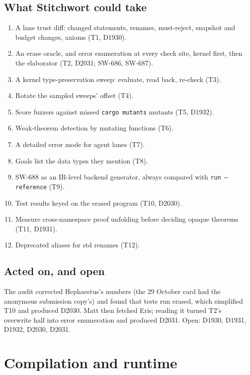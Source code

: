 \documentclass[11pt,a4paper]{article}
\newcommand{\code}[1]{\texttt{#1}}
\begin{document}
\subsection{What Stitchwort could take}
\begin{enumerate}
  \item A lane trust diff: changed statements, renames, must-reject, snapshot and budget
        changes, axioms (T1, D1930).
  \item An erase oracle, and error enumeration at every check site, kernel first, then the
        elaborator (T2, D2031; SW-686, SW-687).
  \item A kernel type-preservation sweep: evaluate, read back, re-check (T3).
  \item Rotate the sampled sweeps' offset (T4).
  \item Score fuzzers against missed \code{cargo mutants} mutants (T5, D1932).
  \item Weak-theorem detection by mutating functions (T6).
  \item A detailed error mode for agent lanes (T7).
  \item Goals list the data types they mention (T8).
  \item SW-688 as an IR-level backend generator, always compared with \code{run --reference}
        (T9).
  \item Test results keyed on the erased program (T10, D2030).
  \item Measure cross-namespace proof unfolding before deciding opaque theorems (T11, D1931).
  \item Deprecated aliases for std renames (T12).
\end{enumerate}

\subsection{Acted on, and open}
The audit corrected Hephaestus's numbers (the 29 October card had the anonymous submission
copy's) and found that tests run erased, which simplified T10 and produced D2030. Matt then
fetched Eris; reading it turned T2's overwrite half into error enumeration and produced D2031.
Open: D1930, D1931, D1932, D2030, D2031.

\section{Compilation and runtime}\label{sec:comp}
\end{document}
